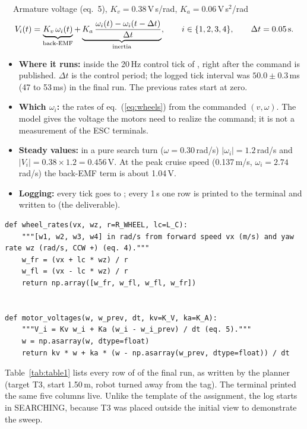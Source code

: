 \begin{keybox}{\faBolt\ \ Armature voltage (eq.~5), $K_v=0.38$\,V\,s/rad, $K_a=0.06$\,V\,s$^2$/rad}
\vspace{-6pt}
\begin{equation}
V_i(t)=\underbrace{K_v\,\omega_i(t)}_{\text{back-EMF}}+\underbrace{K_a\,\frac{\omega_i(t)-\omega_i(t-\Delta t)}{\Delta t}}_{\text{inertia}},
\qquad i\in\{1,2,3,4\},\qquad \Delta t=0.05\text{\,s}.
\label{eq:volt}
\end{equation}
\end{keybox}
\begin{itemize}
  \item \textbf{Where it runs:} inside the 20\,Hz control tick of , right after the command is
        published. $\Delta t$ is the control period; the logged tick interval was $50.0\pm0.3$\,ms (47 to 53\,ms) in
        the final run. The previous rates start at zero.
  \item \textbf{Which $\omega_i$:} the rates of eq.~(\ref{eq:wheels}) from the commanded $(v,\omega)$. The model gives
        the voltage the motors need to realize the command; it is not a measurement of the ESC terminals.
  \item \textbf{Steady values:} in a pure search turn ($\omega=0.30$\,rad/s) $|\omega_i|=1.2$\,rad/s and
        $|V_i|=0.38\times1.2=0.456$\,V. At the peak cruise speed (0.137\,m/s, $\omega_i=2.74$\,rad/s) the back-EMF term
        is about 1.04\,V.
  \item \textbf{Logging:} every tick goes to ; every 1\,s one row is printed to the
        terminal and written to  (the deliverable).
\end{itemize}

\begin{lstlisting}[style=py]
def wheel_rates(vx, wz, r=R_WHEEL, lc=L_C):
    """[w1, w2, w3, w4] in rad/s from forward speed vx (m/s) and yaw rate wz (rad/s, CCW +) (eq. 4)."""
    w_fr = (vx + lc * wz) / r
    w_fl = (vx - lc * wz) / r
    return np.array([w_fr, w_fl, w_fl, w_fr])


def motor_voltages(w, w_prev, dt, kv=K_V, ka=K_A):
    """V_i = Kv w_i + Ka (w_i - w_i_prev) / dt (eq. 5)."""
    w = np.asarray(w, dtype=float)
    return kv * w + ka * (w - np.asarray(w_prev, dtype=float)) / dt
\end{lstlisting}

Table~\ref{tab:table1} lists every row of  of the final run, as written by the planner
(target T3, start 1.50\,m, robot turned away from the tag). The terminal printed the same five columns live.
Unlike the template of the assignment, the log starts in SEARCHING, because T3 was placed outside the initial view
to demonstrate the sweep.

